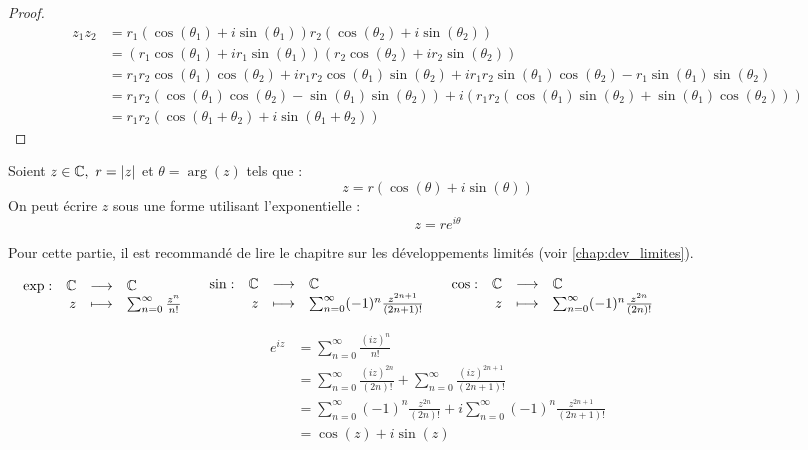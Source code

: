 \begin{proof}
	\begin{align*}
		z_1 z_2 &= r_1(\cos(\theta_1) + i \sin(\theta_1)) r_2(\cos(\theta_2) + i \sin(\theta_2)) \\
		&= (r_1 \cos(\theta_1) + i r_1 \sin(\theta_1))(r_2 \cos(\theta_2) + i r_2 \sin(\theta_2)) \\
		&= r_1 r_2 \cos(\theta_1) \cos(\theta_2) + i r_1 r_2 \cos(\theta_1) \sin(\theta_2) + i r_1 r_2 \sin(\theta_1) \cos(\theta_2) - r_1 \sin(\theta_1) \sin(\theta_2) \\
		&= r_1 r_2 (\cos(\theta_1) \cos(\theta_2) - \sin(\theta_1) \sin(\theta_2)) + i (r_1 r_2(\cos(\theta_1) \sin(\theta_2) + \sin(\theta_1)\cos(\theta_2))) \\
		&= r_1 r_2 (\cos(\theta_1 + \theta_2) + i \sin(\theta_1 + \theta_2))
	\end{align*}
\end{proof}

\begin{definition}
	Soient $z \in \mathbb{C},\ r = \abs{z}$ et $\theta = \arg(z)$ tels que :
	\[ z = r (\cos(\theta) + i \sin(\theta)) \]
	On peut écrire $z$ sous une forme utilisant l'exponentielle :
	\[ z = re^{i \theta} \]
\end{definition}

Pour cette partie, il est recommandé de lire le chapitre sur les développements limités (voir \autoref{chap:dev_limites}).

\begin{center}
	$
	\begin{array}{ccc}
		\begin{array}{rrcl} \exp : & \mathbb{C} & \longrightarrow & \mathbb{C} \\ & z & \longmapsto & \sum_{n = 0}^{\infty} \frac{z^n}{n!} \end{array} &
		\begin{array}{rrcl} \sin : & \mathbb{C} & \longrightarrow & \mathbb{C} \\ & z & \longmapsto & \sum_{n = 0}^{\infty} (-1)^{n} \frac{z^{2n+1}}{(2n+1)!} \end{array} &
		\begin{array}{rrcl} \cos : & \mathbb{C} & \longrightarrow & \mathbb{C} \\ & z & \longmapsto & \sum_{n = 0}^{\infty} (-1)^n \frac{z^{2n}}{(2n)!} \end{array}
	\end{array}
	$
\end{center}

\begin{align*}
	e^{iz} &= \sum_{n = 0}^{\infty} \frac{(iz)^n}{n!} \\
	       &= \sum_{n = 0}^{\infty} \frac{(iz)^{2n}}{(2n)!} + \sum_{n = 0}^{\infty} \frac{(iz)^{2n + 1}}{(2n + 1)!} \\
	       &= \sum_{n = 0}^{\infty} (-1)^n \frac{z^{2n}}{(2n)!} + i \sum_{n = 0}^{\infty} (-1)^n \frac{z^{2n+1}}{(2n+1)!} \\
	       &= \cos(z) + i \sin(z)
\end{align*}

